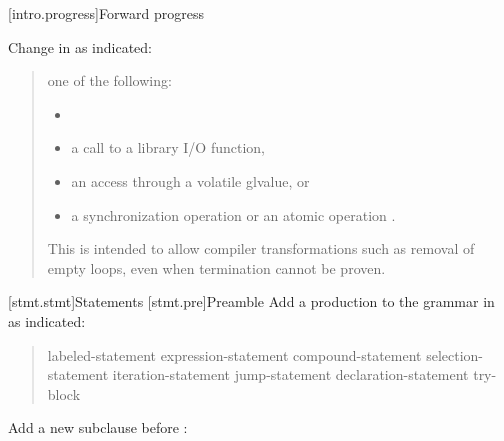 [intro.progress]{Forward progress} 

Change in  as indicated:

\begin{quote}
\pnum
{}
 one of the following:

\begin{itemize}
\tightlist
\item
\item
  a call to a library I/O function,
\item
  an access through a volatile glvalue, or
\item
  a synchronization operation or an atomic operation
  \added{({[}atomics{]})}.
\end{itemize}

\begin{note}
This is intended to allow compiler transformations
such as removal of empty loops, even when termination cannot be proven.
\end{note}
\end{quote}

\setcounter{chapter}{7}

[stmt.stmt]{Statements}
[stmt.pre]{Preamble}  
\pnum
Add a production to the grammar in  as indicated:

\begin{quote}
\begin{bnf}
\br
    labeled-statement\br
     expression-statement\br
     compound-statement\br
     selection-statement\br
     iteration-statement\br
     jump-statement\br
    declaration-statement\br
     try-block\br
\end{bnf}
\end{quote}

\setcounter{section}{7}

Add a new subclause before :


